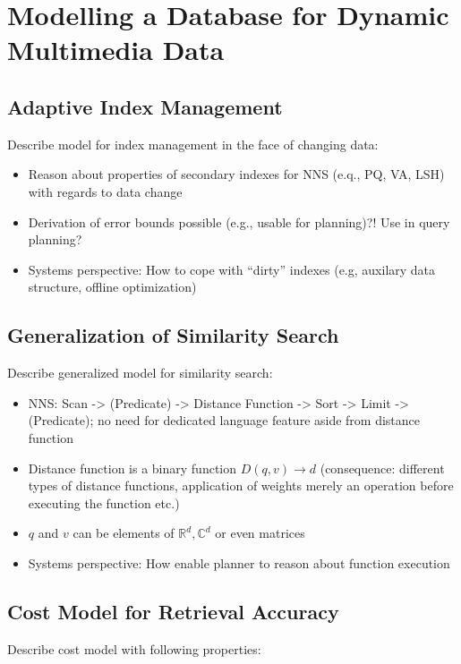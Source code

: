 \chapter{Modelling a Database for Dynamic Multimedia Data}


\section{Adaptive Index Management}
Describe model for index management in the face of changing data:

\begin{itemize}
    \item Reason about properties of secondary indexes for NNS (e.q., PQ, VA, LSH) with regards to data change
    \item Derivation of error bounds possible (e.g., usable for planning)?! Use in query planning?
    \item Systems perspective: How to cope with ``dirty'' indexes (e.g, auxilary data structure, offline optimization)
\end{itemize}

\section{Generalization of Similarity Search}

Describe generalized model for similarity search:

\begin{itemize}
    \item NNS: Scan -> (Predicate) -> Distance Function -> Sort -> Limit -> (Predicate); no need for dedicated language feature aside from distance function
    \item Distance function is a binary function $D(q,v) \longrightarrow d$ (consequence: different types of distance functions, application of weights merely an operation before executing the function etc.)
    \item $q$ and $v$ can be elements of $\mathbb{R}^d,\mathbb{C}^d$ or even matrices
    \item Systems perspective: How enable planner to reason about function execution
\end{itemize}

\section{Cost Model for Retrieval Accuracy}
Describe cost model with following properties:

